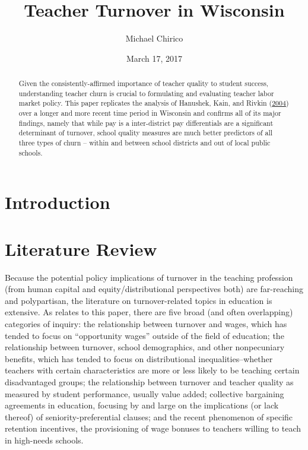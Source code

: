 \documentclass[]{article}
\title{Teacher Turnover in Wisconsin}
\author{Michael Chirico}
\date{March 17, 2017}
\begin{document}
\maketitle
\begin{abstract}
Given the consistently-affirmed importance of teacher quality to student
success, understanding teacher churn is crucial to formulating and
evaluating teacher labor market policy. This paper replicates the
analysis of Hanushek, Kain, and Rivkin
(\protect\hyperlink{ref-hanushek}{2004}) over a longer and more recent
time period in Wisconsin and confirms all of its major findings, namely
that while pay is a inter-district pay differentials are a significant
determinant of turnover, school quality measures are much better
predictors of all three types of churn -- within and between school
districts and out of local public schools.
\end{abstract}

\section{Introduction}\label{introduction}

\section{Literature Review}\label{literature-review}

Because the potential policy implications of turnover in the teaching
profession (from human capital and equity/distributional perspectives
both) are far-reaching and polypartisan, the literature on
turnover-related topics in education is extensive. As relates to this
paper, there are five broad (and often overlapping) categories of
inquiry: the relationship between turnover and wages, which has tended
to focus on ``opportunity wages'' outside of the field of education; the
relationship between turnover, school demographics, and other
nonpecuniary benefits, which has tended to focus on distributional
inequalities--whether teachers with certain characteristics are more or
less likely to be teaching certain disadvantaged groups; the
relationship between turnover and teacher quality as measured by student
performance, usually value added; collective bargaining agreements in
education, focusing by and large on the implications (or lack thereof)
of seniority-preferential clauses; and the recent phenomenon of specific
retention incentives, the provisioning of wage bonuses to teachers
willing to teach in high-needs schools.
\end{document}
